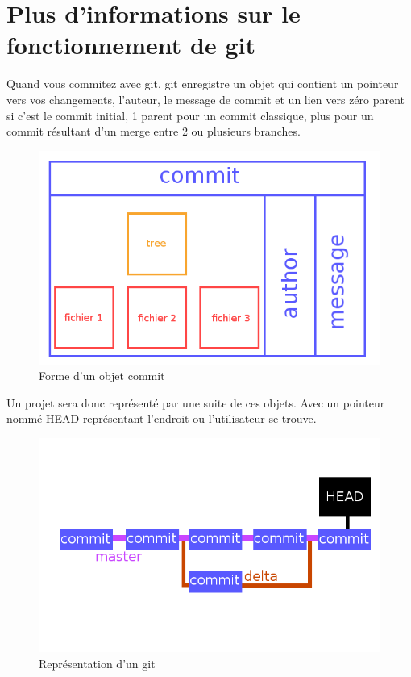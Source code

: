 \documentclass[a4paper,10pt]{report}
\begin{document}
	\section{Plus d'informations sur le fonctionnement de git}
	Quand vous commitez avec git, git enregistre un objet qui contient un pointeur vers vos changements, l'auteur, le message de commit et un lien vers zéro parent si c'est le commit initial, 1 parent pour un commit classique, plus pour un commit résultant d'un merge entre 2 ou plusieurs branches.
\begin{figure}[h!]
  \begin{center}
    \includegraphics[scale=0.3]{images/objetcommit}
    \caption{Forme d'un objet commit}
    \label{obCommit}
  \end{center}
\end{figure}
	Un projet sera donc représenté par une suite de ces objets. Avec un pointeur nommé HEAD représentant l'endroit ou l'utilisateur se trouve.
\begin{figure}[h!]
  \begin{center}
    \includegraphics[scale=0.3]{images/git}
    \caption{Représentation d'un git}
    \label{obgit}
  \end{center}
\end{figure}
\end{document}
